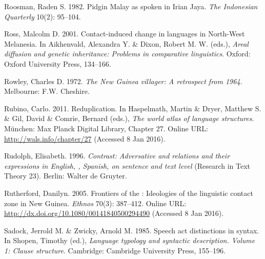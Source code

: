 \begin{styleCitaviBibliographyEntry}
Roosman, Raden S. 1982. Pidgin Malay as spoken in Irian Jaya. \textit{The Indonesian Quarterly} 10(2): 95–104.
\end{styleCitaviBibliographyEntry}

\begin{styleCitaviBibliographyEntry}
Ross, Malcolm D. 2001. Contact-induced change in  languages in North-West Melanesia. In Aikhenvald, Alexandra Y. \& Dixon, Robert M. W. (eds.), \textit{Areal diffusion and genetic inheritance: Problems in comparative linguistics}. Oxford: Oxford University Press, 134–166.
\end{styleCitaviBibliographyEntry}

\begin{styleCitaviBibliographyEntry}
Rowley, Charles D. 1972. \textit{The New Guinea villager: A retrospect from 1964}. Melbourne: F.W. Cheshire.
\end{styleCitaviBibliographyEntry}

\begin{styleCitaviBibliographyEntry}
Rubino, Carlo. 2011. Reduplication. In Haspelmath, Martin \& Dryer, Matthew S. \& Gil, David \& Comrie, Bernard (eds.), \textit{The world atlas of language structures}. München: Max Planck Digital Library, Chapter 27. Online URL: \url{http://wals.info/chapter/27} (Accessed 8 Jan 2016).
\end{styleCitaviBibliographyEntry}

\begin{styleCitaviBibliographyEntry}
Rudolph, Elisabeth. 1996. \textit{Contrast: Adversative and  relations and their expressions in English, , Spanish,  on sentence and text level} (Research in Text Theory 23). Berlin: Walter de Gruyter.
\end{styleCitaviBibliographyEntry}

\begin{styleCitaviBibliographyEntry}
Rutherford, Danilyn. 2005. Frontiers of the : Ideologies of the linguistic contact zone in  New Guinea. \textit{Ethnos} 70(3): 387–412. Online URL: \url{http://dx.doi.org/10.1080/00141840500294490} (Accessed 8 Jan 2016).
\end{styleCitaviBibliographyEntry}

\begin{styleCitaviBibliographyEntry}
Sadock, Jerrold M. \& Zwicky, Arnold M. 1985. Speech act distinctions in syntax. In Shopen, Timothy (ed.), \textit{Language typology and syntactic description. Volume 1: Clause structure}. Cambridge: Cambridge University Press, 155–196.
\end{styleCitaviBibliographyEntry}


